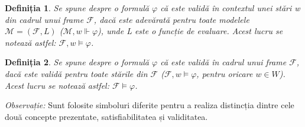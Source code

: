 \documentclass[12pt, openany]{book}
\newtheorem{definition}{Definiția}[chapter] %
\begin{document}
            \begin{definition}
                Se spune despre o formulă $\varphi$ că este validă în contextul unei stări w din cadrul unui \textit{frame} 
                $\mathcal{F}$, dacă este adevărată pentru toate modelele $\mathcal{M}=(\mathcal{F}, L)$ ($\mathcal{M},w \Vdash \varphi$),
                unde L este o funcție de evaluare. Acest lucru se notează astfel: $\mathcal{F},w \vDash \varphi$.
            \end{definition}

            \begin{definition}
                Se spune despre o formulă $\varphi$ că este validă în cadrul unui \textit{frame} $\mathcal{F}$, dacă este 
                validă pentru toate stările din $\mathcal{F}$ ($\mathcal{F},w \vDash \varphi$, pentru oricare $w \in W$). 
                Acest lucru se notează astfel: $\mathcal{F} \vDash \varphi$.
            \end{definition}

            \par{}
                \noindent \textit{Observație:} Sunt folosite simboluri diferite pentru a realiza distincția dintre cele două concepte
                prezentate, satisfiabilitatea și validitatea.
\end{document}
